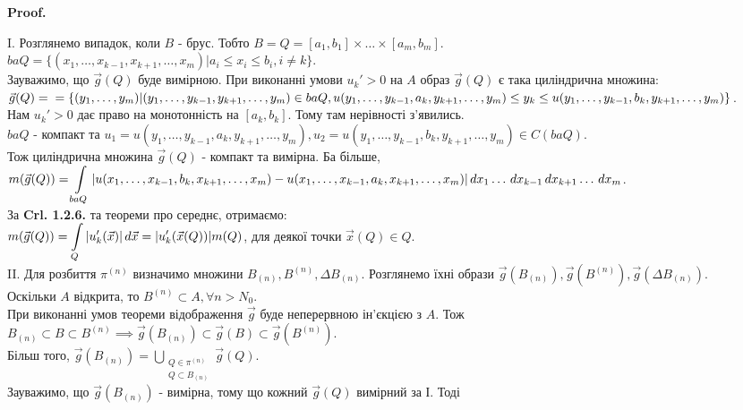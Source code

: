 \documentclass[a4paper, 10pt]{article}
\makeatletter
\def\qed{$\blacksquare$}
\theoremstyle{theoremdd}
\theoremstyle{theoremdd}
\theoremstyle{theoremdd}
\theoremstyle{theoremdd}
\theoremstyle{theoremdd}
\theoremstyle{theoremdd}
\theoremstyle{theoremdd}
\theoremstyle{theoremdd}
\renewenvironment{proof}[1][Proof.\\]{\par
\pushQED{\hfill \qed}%
\normalfont \topsep6\p@\@plus6\p@\relax
\trivlist
\item\relax
{\bfseries
#1\@addpunct{.}}\hspace\labelsep\ignorespaces
}{%
\popQED\endtrivlist\@endpefalse
}
\makeatother
\begin{document}
\begin{proof}
I. Розглянемо випадок, коли $B$ - брус. Тобто $B = Q = [a_1,b_1] \times \dots \times [a_m,b_m]$.\\
$baQ = \{(x_1,\dots,x_{k-1},x_{k+1},\dots,x_m) | a_i \leq x_i \leq b_i, i \neq k\}$.\\
Зауважимо, що $\vec{g}(Q)$ буде вимірною. При виконанні умови $u_k'>0$ на $A$ образ $\vec{g}(Q)$ є така циліндрична множина:\\
$\vec{g}(Q) = \\ =\{(y_1,\dots,y_m) | (y_1,\dots,y_{k-1},y_{k+1},\dots,y_m) \in baQ, u(y_1,\dots,y_{k-1},a_k,y_{k+1},\dots,y_m) \leq y_k \leq u(y_1,\dots,y_{k-1},b_k,y_{k+1},\dots,y_m)\}$.\\
Нам $u_k' > 0$ дає право на монотонність на $[a_k,b_k]$. Тому там нерівності з'явились.\\
$baQ$ - компакт та $u_1 = u(y_1,\dots,y_{k-1},a_k,y_{k+1},\dots,y_m), u_2 = u(y_1,\dots,y_{k-1},b_k,y_{k+1},\dots,y_m) \in C(baQ)$.\\
Тож циліндрична множина $\vec{g}(Q)$ - компакт та вимірна. Ба більше,\\
$m(\vec{g}(Q)) = \displaystyle\int\displaylimits_{baQ} |u(x_1,\dots,x_{k-1},b_k,x_{k+1},\dots,x_m) - u(x_1,\dots,x_{k-1},a_k,x_{k+1},\dots,x_m)|\,dx_1\dots\,dx_{k-1}\,dx_{k+1}\dots\,dx_m$.\\
За \textbf{Crl. 1.2.6.} та теореми про середнє, отримаємо:\\
$m(\vec{g}(Q)) = \displaystyle\int\displaylimits_Q |u'_k(\vec{x})|\,d\vec{x} = |u_k'(\vec{x}(Q))| m(Q)$, для деякої точки $\vec{x}(Q) \in Q$.
\bigskip \\
II. Для розбиття $\pi^{(n)}$ визначимо множини $B_{(n)}, B^{(n)}, \Delta B_{(n)}$. Розглянемо їхні образи $\vec{g}(B_{(n)}), \vec{g}(B^{(n)}), \vec{g}(\Delta B_{(n)})$.\\
Оскільки $A$ відкрита, то $B^{(n)} \subset A, \forall n > N_0$.\\
При виконанні умов теореми відображення $\vec{g}$ буде неперервною ін'єкцією з $A$. Тож\\
$B_{(n)} \subset B \subset B^{(n)} \implies \vec{g}(B_{(n)}) \subset \vec{g}(B) \subset \vec{g}(B^{(n)})$.\\
Більш того, $\vec{g}(B_{(n)}) = \displaystyle\bigcup_{\substack{Q \in \pi^{(n)} \\ Q \subset B_{(n)}}} \vec{g}(Q)$.\\
Зауважимо, що $\vec{g}(B_{(n)})$ - вимірна, тому що кожний $\vec{g}(Q)$ вимірний за І. Тоді\\

\end{proof}
\end{document}
